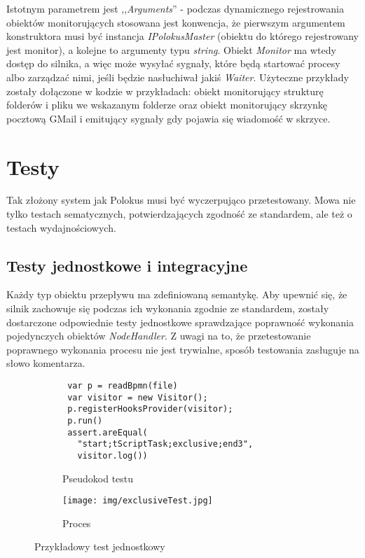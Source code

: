 \documentclass[declaration,shortabstract,mgr]{iithesis}
\begin{document}
 Istotnym parametrem jest ,,\textit{Arguments}'' - podczas dynamicznego rejestrowania obiektów monitorujących stosowana jest konwencja, że pierwszym argumentem konstruktora musi być instancja \textit{IPolokusMaster} (obiektu do którego rejestrowany jest monitor), a kolejne to argumenty typu \textit{string}. Obiekt \textit{Monitor} ma wtedy dostęp do silnika, a więc może wysyłać sygnały, które będą startować procesy albo zarządzać nimi, jeśli będzie nasłuchiwał jakiś \textit{Waiter}. Użyteczne przykłady zostały dołączone w kodzie w przykładach: obiekt monitorujący strukturę folderów i pliku we wskazanym folderze oraz obiekt monitorujący skrzynkę pocztową GMail i emitujący sygnały gdy pojawia się wiadomość w skrzyce.

\chapter{Testy}\label{chapter-tests}
Tak złożony system jak Polokus musi być wyczerpująco przetestowany. Mowa nie tylko testach sematycznych, potwierdzających zgodność ze standardem, ale też o testach wydajnościowych.

\section{Testy jednostkowe i integracyjne}
Każdy typ obiektu przepływu ma zdefiniowaną semantykę. Aby upewnić się, że silnik zachowuje się podczas ich wykonania zgodnie ze standardem, zostały dostarczone odpowiednie testy jednostkowe sprawdzające poprawność wykonania pojedynczych obiektów \textit{NodeHandler}. Z uwagi na to, że przetestowanie poprawnego wykonania procesu nie jest trywialne, sposób testowania zasługuje na słowo komentarza.
\begin{figure}[H]
     \centering
     \begin{subfigure}[b]{0.59\textwidth}
\begin{minipage}[c]{\textwidth}
\centering
\begin{lstlisting}
 var p = readBpmn(file)
 var visitor = new Visitor();
 p.registerHooksProvider(visitor);
 p.run()
 assert.areEqual(
   "start;tScriptTask;exclusive;end3",
   visitor.log())
\end{lstlisting}
\end{minipage}
        \caption{Pseudokod testu}
     \end{subfigure}
     \hfill
     \begin{subfigure}[b]{0.39\textwidth}
         \centering
         \texttt{[image: img/exclusiveTest.jpg]}
        \caption{Proces}
     \end{subfigure}
        \caption{Przykładowy test jednostkowy}
        \label{fig:unit-test}
\end{figure}
\end{document}
